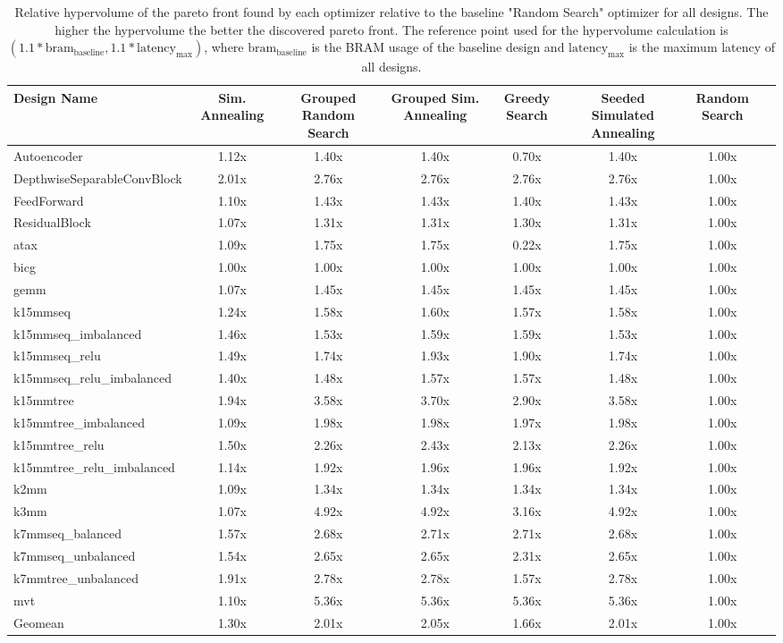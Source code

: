 \begin{table}[th]
\caption{Relative hypervolume of the pareto front found by each optimizer relative to the baseline "Random Search" optimizer for all designs. The higher the hypervolume the better the discovered pareto front. The reference point used for the hypervolume calculation is $(1.1*\text{bram}_\text{baseline}, 1.1*\text{latency}_\text{max})$, where $\text{bram}_\text{baseline}$ is the BRAM usage of the baseline design and $\text{latency}_\text{max}$ is the maximum latency of all designs.}
\label{tab:hypervolume}
\begin{tabular}{l|ccccccc}
\toprule
Design Name & Sim. Annealing & Grouped Random Search & Grouped Sim. Annealing & Greedy Search & Seeded Simulated Annealing & Random Search \\
\midrule
Autoencoder & 1.12x & 1.40x & 1.40x & 0.70x & 1.40x & 1.00x \\
DepthwiseSeparableConvBlock & 2.01x & 2.76x & 2.76x & 2.76x & 2.76x & 1.00x \\
FeedForward & 1.10x & 1.43x & 1.43x & 1.40x & 1.43x & 1.00x \\
ResidualBlock & 1.07x & 1.31x & 1.31x & 1.30x & 1.31x & 1.00x \\
atax & 1.09x & 1.75x & 1.75x & 0.22x & 1.75x & 1.00x \\
bicg & 1.00x & 1.00x & 1.00x & 1.00x & 1.00x & 1.00x \\
gemm & 1.07x & 1.45x & 1.45x & 1.45x & 1.45x & 1.00x \\
k15mmseq & 1.24x & 1.58x & 1.60x & 1.57x & 1.58x & 1.00x \\
k15mmseq\_imbalanced & 1.46x & 1.53x & 1.59x & 1.59x & 1.53x & 1.00x \\
k15mmseq\_relu & 1.49x & 1.74x & 1.93x & 1.90x & 1.74x & 1.00x \\
k15mmseq\_relu\_imbalanced & 1.40x & 1.48x & 1.57x & 1.57x & 1.48x & 1.00x \\
k15mmtree & 1.94x & 3.58x & 3.70x & 2.90x & 3.58x & 1.00x \\
k15mmtree\_imbalanced & 1.09x & 1.98x & 1.98x & 1.97x & 1.98x & 1.00x \\
k15mmtree\_relu & 1.50x & 2.26x & 2.43x & 2.13x & 2.26x & 1.00x \\
k15mmtree\_relu\_imbalanced & 1.14x & 1.92x & 1.96x & 1.96x & 1.92x & 1.00x \\
k2mm & 1.09x & 1.34x & 1.34x & 1.34x & 1.34x & 1.00x \\
k3mm & 1.07x & 4.92x & 4.92x & 3.16x & 4.92x & 1.00x \\
k7mmseq\_balanced & 1.57x & 2.68x & 2.71x & 2.71x & 2.68x & 1.00x \\
k7mmseq\_unbalanced & 1.54x & 2.65x & 2.65x & 2.31x & 2.65x & 1.00x \\
k7mmtree\_unbalanced & 1.91x & 2.78x & 2.78x & 1.57x & 2.78x & 1.00x \\
mvt & 1.10x & 5.36x & 5.36x & 5.36x & 5.36x & 1.00x \\
\hline
Geomean & 1.30x & 2.01x & 2.05x & 1.66x & 2.01x & 1.00x & \\
\bottomrule

\end{tabular}
\end{table}
